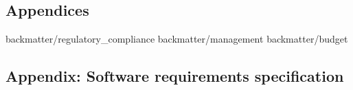 \begin{appendices}
\setcounter{chapter}{9}
\setcounter{section}{0}

\chapter{Appendices}
	 {backmatter/regulatory_compliance}
	\newpage
	 {backmatter/management}
	\newpage
		 {backmatter/budget}

	\newpage
	\section{Appendix: Software requirements specification}
		\label{requirements}
		

	


\end{appendices}
